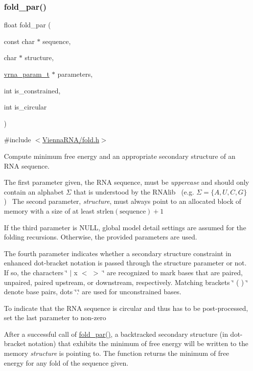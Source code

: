 \subsubsection{\texorpdfstring{fold\+\_\+par()}{fold\_par()}}
{\footnotesize\ttfamily float fold\+\_\+par (\begin{DoxyParamCaption}\item[{const char $\ast$}]{sequence,  }\item[{char $\ast$}]{structure,  }\item[{\hyperlink{group__energy__parameters_ga8a69ca7d787e4fd6079914f5343a1f35}{vrna\+\_\+param\+\_\+t} $\ast$}]{parameters,  }\item[{int}]{is\+\_\+constrained,  }\item[{int}]{is\+\_\+circular }\end{DoxyParamCaption})}



{\ttfamily \#include $<$\hyperlink{fold_8h}{Vienna\+R\+N\+A/fold.\+h}$>$}



Compute minimum free energy and an appropriate secondary structure of an R\+NA sequence. 

The first parameter given, the R\+NA sequence, must be {\itshape uppercase} and should only contain an alphabet $\Sigma$ that is understood by the R\+N\+Alib~\newline
(e.\+g. $ \Sigma = \{A,U,C,G\} $)~\newline
 The second parameter, {\itshape structure}, must always point to an allocated block of memory with a size of at least $\mathrm{strlen}(\mathrm{sequence})+1$

If the third parameter is N\+U\+LL, global model detail settings are assumed for the folding recursions. Otherwise, the provided parameters are used.

The fourth parameter indicates whether a secondary structure constraint in enhanced dot-\/bracket notation is passed through the structure parameter or not. If so, the characters \char`\"{} $\vert$ x $<$ $>$ \char`\"{} are recognized to mark bases that are paired, unpaired, paired upstream, or downstream, respectively. Matching brackets \char`\"{} ( ) \char`\"{} denote base pairs, dots \char`\"{}.\char`\"{} are used for unconstrained bases.

To indicate that the R\+NA sequence is circular and thus has to be post-\/processed, set the last parameter to non-\/zero

After a successful call of \hyperlink{group__mfe__fold__single_ga2bc41df5d71fee6fd8da9904ee65d8fb}{fold\+\_\+par()}, a backtracked secondary structure (in dot-\/bracket notation) that exhibits the minimum of free energy will be written to the memory {\itshape structure} is pointing to. The function returns the minimum of free energy for any fold of the sequence given.

